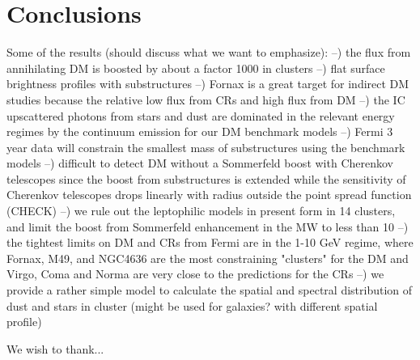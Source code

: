 \documentclass[10pt,aps,pra,reprint,amsmath,amsfonts,amssymb,showpacs]{revtex4-1}
\begin{document}
%


\section{Conclusions}

Some of the results (should discuss what we want to emphasize):
--) the flux from annihilating DM is boosted by about a factor 1000 in
 clusters
--) flat surface brightness profiles with substructures
--) Fornax is a great target for indirect DM studies because the relative
 low flux from CRs and high flux from DM
--) the IC upscattered photons from stars and dust are dominated in the
 relevant energy regimes by the continuum emission for our DM
 benchmark models
--) Fermi 3 year data will constrain the smallest mass of substructures
 using the benchmark models
--) difficult to detect DM without a Sommerfeld boost with Cherenkov
 telescopes since the boost from substructures is extended while the
 sensitivity of Cherenkov telescopes drops linearly with radius
 outside the point spread function (CHECK)
--) we rule out the leptophilic models in present form in 14 clusters,
 and limit the boost from Sommerfeld enhancement in the MW to less
 than 10
--) the tightest limits on DM and CRs from Fermi are in the 1-10 GeV
 regime, where Fornax, M49, and NGC4636 are the most constraining
 "clusters" for the DM and Virgo, Coma and Norma are very close to the
 predictions for the CRs
--) we provide a rather simple model to calculate the spatial and spectral
 distribution of dust and stars in cluster (might be used for
 galaxies? with different spatial profile)




\smallskip
We wish to thank...

%


\vspace{-0.7cm}

%
%
\end{document}
